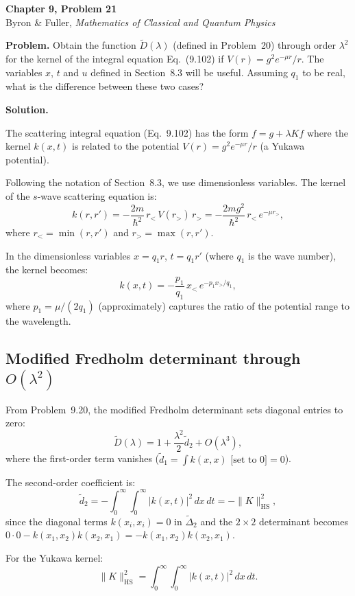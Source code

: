 \documentclass[12pt]{article}
\begin{document}
\begin{center}
{\Large\bfseries Chapter 9, Problem 21}\\[6pt]
Byron \& Fuller, \textit{Mathematics of Classical and Quantum Physics}
\end{center}

\bigskip

\textbf{Problem.} Obtain the function $\tilde{D}(\lambda)$ (defined in Problem~20) through order $\lambda^2$ for the kernel of the integral equation Eq.~(9.102) if $V(r) = g^2 e^{-\mu r}/r$. The variables $x$, $t$ and $u$ defined in Section~8.3 will be useful. Assuming $q_1$ to be real, what is the difference between these two cases?

\bigskip
\textbf{Solution.}

The scattering integral equation (Eq.~9.102) has the form $f = g + \lambda Kf$ where the kernel $k(x,t)$ is related to the potential $V(r) = g^2 e^{-\mu r}/r$ (a Yukawa potential).

Following the notation of Section~8.3, we use dimensionless variables. The kernel of the $s$-wave scattering equation is:
\[
k(r,r') = -\frac{2m}{\hbar^2}\,r_<\,V(r_>)\,r_> = -\frac{2mg^2}{\hbar^2}\,r_<\,e^{-\mu r_>},
\]
where $r_< = \min(r,r')$ and $r_> = \max(r,r')$.

In the dimensionless variables $x = q_1 r$, $t = q_1 r'$ (where $q_1$ is the wave number), the kernel becomes:
\[
k(x,t) = -\frac{p_1}{q_1}\,x_<\,e^{-p_1 x_>/q_1},
\]
where $p_1 = \mu/(2q_1)$ (approximately) captures the ratio of the potential range to the wavelength.

\subsection*{Modified Fredholm determinant through $O(\lambda^2)$}

From Problem~9.20, the modified Fredholm determinant sets diagonal entries to zero:
\[
\tilde{D}(\lambda) = 1 + \frac{\lambda^2}{2}\tilde{d}_2 + O(\lambda^3),
\]
where the first-order term vanishes ($\tilde{d}_1 = \int k(x,x)\text{ [set to 0]} = 0$).

The second-order coefficient is:
\[
\tilde{d}_2 = -\int_0^\infty\!\!\int_0^\infty |k(x,t)|^2\,dx\,dt = -\|K\|_{\text{HS}}^2,
\]
since the diagonal terms $k(x_i,x_i) = 0$ in $\tilde{\Delta}_2$ and the $2\times 2$ determinant becomes $0 \cdot 0 - k(x_1,x_2)k(x_2,x_1) = -k(x_1,x_2)k(x_2,x_1)$.

For the Yukawa kernel:
\[
\|K\|_{\text{HS}}^2 = \int_0^\infty\!\!\int_0^\infty |k(x,t)|^2\,dx\,dt.
\]
\end{document}
